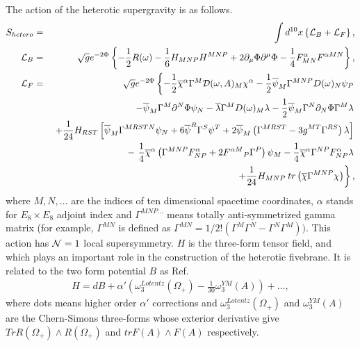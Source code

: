 \documentclass[a4paper,aps, amssymb, preprint, 12pt]{revtex4}
\begin{document}
The action of the heterotic supergravity is as follows\cite{BdR,Bellisai}.
\begin{eqnarray}  %
S_{hetero} &=& \int d^{10}x\left\{{\cal L}_{B}+{\cal L}_{F} \right \}, \label{S_hetero}\\
{\cal L}_{B} &=&
\sqrt{g}e^{-2\Phi}\left\{-\frac{1}{2}R(\omega)-\frac{1}{6}H_{MNP}H^{MNP}+2\partial_\mu\Phi\partial^\mu\Phi -\frac{1}{4}F^{\alpha}_{MN}F^{\alpha MN}\right\}, \label{bosonic_Lagrangian} \\
{\cal L}_{F} &=& 
\sqrt{g}e^{-2\Phi}\left\{
-\frac{1}{2}\overline{\chi}^\alpha\Gamma^M{\cal D}(\omega, A)_M\chi^\alpha
-\frac{1}{2}\overline{\psi}_M\Gamma^{MNP}D(\omega)_N\psi_P \right. \nonumber \\
&&{}\left.-\overline{\psi}_M\Gamma^M\partial^N\Phi\psi_N
-\overline{\lambda}\Gamma^M D(\omega)_M\lambda
-\frac{1}{2}\overline{\psi}_M\Gamma^N\partial_N\Phi\Gamma^M\lambda \right.\nonumber \\
&&{}\left.+\frac{1}{24}H_{RST}\left[
\overline{\psi}_M\Gamma^{MRSTN}\psi_N
+6\overline{\psi}^R\Gamma^S\psi^T
+2\overline{\psi}_M\left(\Gamma^{MRST}-3g^{MT}\Gamma^{RS}\right)\lambda
\right] \right. \nonumber \\
&&{}-\left.\frac{1}{4}\overline{\chi}^\alpha\left(
\Gamma^{MNP}F^\alpha_{NP}+2{F^{\alpha M}}_{P}\Gamma^P
\right)\psi_M
-\frac{1}{4}\overline{\chi}^\alpha\Gamma^{NP}F^\alpha_{NP}\lambda \right.\nonumber \\
&&{}\left.+\frac{1}{24}H_{MNP}\:tr\left(\overline{\chi}\Gamma^{MNP}\chi\right)\right\}, \label{fermionic_Lagrangian}
\end{eqnarray}
where $M,N,\ldots$ are the indices of ten dimensional spacetime coordinates, $\alpha$ stands for $E_8\times E_8$ adjoint index and $\Gamma^{MNP\ldots}$ means totally anti-symmetrized gamma matrix (for example, $\Gamma^{MN}$ is defined as $\Gamma^{MN}=1/2!(\Gamma^M\Gamma^N-\Gamma^N\Gamma^M))$.
This action has ${\cal N}=1$ local supersymmetry.
$H$ is the three-form tensor field, and which plays an important role in the construction of the heterotic fivebrane.
It is related to the two form potential $B$ as Ref.\cite{GS}
\begin{eqnarray}
H=dB+\alpha'\left(\omega_{3}^{Lotentz}(\Omega_{+}) -\frac{1}{30}\omega_{3}^{YM}(A)\right)+\ldots, \label{H_definition}
\end{eqnarray}
where dots means higher order $\alpha'$ corrections and $\omega_{3}^{Lotentz}(\Omega_{+})$ and $\omega_{3}^{YM}(A)$ are the Chern-Simons three-forms whose exterior derivative give $TrR(\Omega_{+})\wedge{R}(\Omega_{+})$ and $trF(A)\wedge{F}(A)$ respectively.
\end{document}
